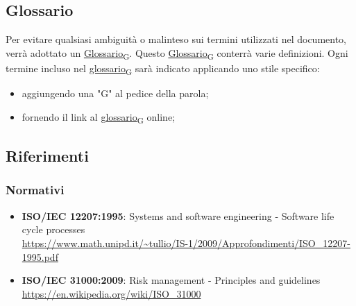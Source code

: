 \subsection{Glossario}
Per evitare qualsiasi ambiguità o malinteso sui termini utilizzati nel documento, verrà adottato un \href{https://7last.github.io/docs/rtb/documentazione-interna/glossario#glossario}{Glossario\textsubscript{G}}. Questo \href{https://7last.github.io/docs/rtb/documentazione-interna/glossario#glossario}{Glossario\textsubscript{G}} conterrà varie definizioni. Ogni termine incluso nel \href{https://7last.github.io/docs/rtb/documentazione-interna/glossario#glossario}{glossario\textsubscript{G}} sarà indicato applicando uno stile specifico:
\begin{itemize}
	\item aggiungendo una "G" al pedice della parola;
	\item fornendo il link al \href{https://7last.github.io/docs/rtb/documentazione-interna/glossario\#glossario}{glossario\textsubscript{G}} online;
\end{itemize}

\subsection{Riferimenti}
\subsubsection{Normativi} 
\begin{itemize}
	\item \textbf{ISO/IEC 12207:1995}: Systems and software engineering - Software life cycle processes \\\url{https://www.math.unipd.it/~tullio/IS-1/2009/Approfondimenti/ISO_12207-1995.pdf}
	\item \textbf{ISO/IEC 31000:2009}: Risk management - Principles and guidelines \\\url{https://en.wikipedia.org/wiki/ISO_31000}
\end{itemize}
